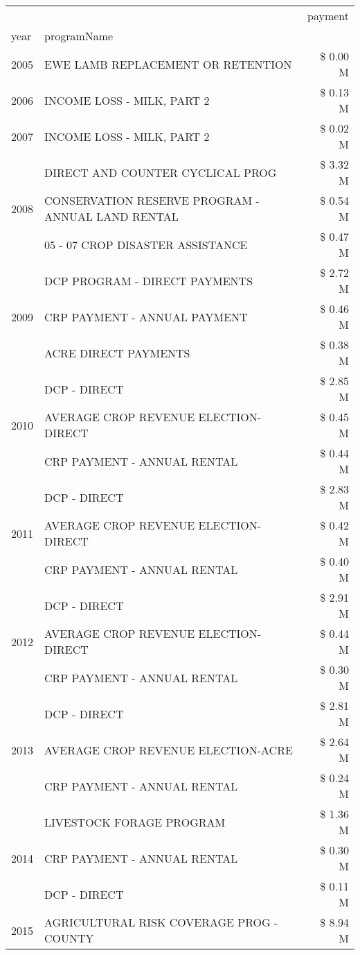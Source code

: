 \begin{tabular}{llr}
\toprule
 &  & payment \\
year & programName &  \\
\midrule
2005 & EWE LAMB REPLACEMENT OR RETENTION & \$ 0.00 M \\
\cline{1-3}
2006 & INCOME LOSS - MILK, PART 2 & \$ 0.13 M \\
\cline{1-3}
2007 & INCOME LOSS - MILK, PART 2 & \$ 0.02 M \\
\cline{1-3}
\multirow[t]{3}{*}{2008} & DIRECT AND COUNTER CYCLICAL PROG & \$ 3.32 M \\
 & CONSERVATION RESERVE PROGRAM - ANNUAL LAND RENTAL & \$ 0.54 M \\
 & 05 - 07 CROP DISASTER ASSISTANCE & \$ 0.47 M \\
\cline{1-3}
\multirow[t]{3}{*}{2009} & DCP PROGRAM - DIRECT PAYMENTS & \$ 2.72 M \\
 & CRP PAYMENT - ANNUAL PAYMENT & \$ 0.46 M \\
 & ACRE DIRECT PAYMENTS & \$ 0.38 M \\
\cline{1-3}
\multirow[t]{3}{*}{2010} & DCP - DIRECT & \$ 2.85 M \\
 & AVERAGE CROP REVENUE ELECTION-DIRECT & \$ 0.45 M \\
 & CRP PAYMENT - ANNUAL RENTAL & \$ 0.44 M \\
\cline{1-3}
\multirow[t]{3}{*}{2011} & DCP - DIRECT & \$ 2.83 M \\
 & AVERAGE CROP REVENUE ELECTION-DIRECT & \$ 0.42 M \\
 & CRP PAYMENT - ANNUAL RENTAL & \$ 0.40 M \\
\cline{1-3}
\multirow[t]{3}{*}{2012} & DCP - DIRECT & \$ 2.91 M \\
 & AVERAGE CROP REVENUE ELECTION-DIRECT & \$ 0.44 M \\
 & CRP PAYMENT - ANNUAL RENTAL & \$ 0.30 M \\
\cline{1-3}
\multirow[t]{3}{*}{2013} & DCP - DIRECT & \$ 2.81 M \\
 & AVERAGE CROP REVENUE ELECTION-ACRE & \$ 2.64 M \\
 & CRP PAYMENT - ANNUAL RENTAL & \$ 0.24 M \\
\cline{1-3}
\multirow[t]{3}{*}{2014} & LIVESTOCK FORAGE PROGRAM & \$ 1.36 M \\
 & CRP PAYMENT - ANNUAL RENTAL & \$ 0.30 M \\
 & DCP - DIRECT & \$ 0.11 M \\
\cline{1-3}
\multirow[t]{3}{*}{2015} & AGRICULTURAL RISK COVERAGE PROG - COUNTY & \$ 8.94 M \\

\end{tabular}
